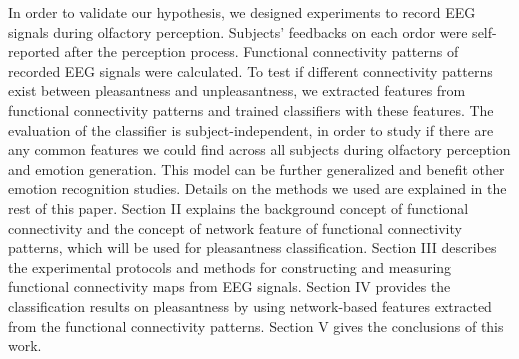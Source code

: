 In order to validate our hypothesis, we designed experiments to record EEG signals during olfactory perception. Subjects' feedbacks on each ordor were self-reported after the perception process. Functional connectivity patterns of recorded EEG signals were calculated. To test if different connectivity patterns exist between pleasantness and unpleasantness, we extracted features from functional connectivity patterns and trained classifiers with these features. The evaluation of the classifier is subject-independent, in order to study if there are any common features we could find across all subjects during olfactory perception and emotion generation. This model can be further generalized and benefit other emotion recognition studies. Details on the methods we used are explained in the rest of this paper. Section II explains the background concept of functional connectivity and the concept of network feature of functional connectivity patterns, which will be used for pleasantness classification. Section III describes the experimental protocols and methods for constructing and measuring functional connectivity maps from EEG signals. Section IV provides the classification results on pleasantness by using network-based features extracted from the functional connectivity patterns. Section V gives the conclusions of this work. 